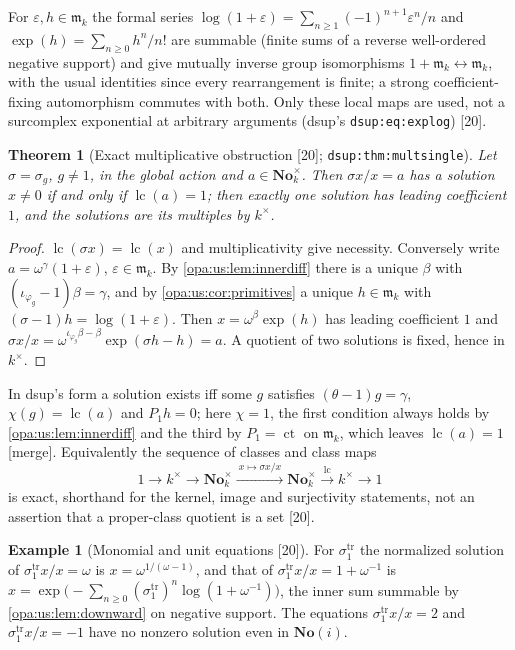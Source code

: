 \documentclass[11pt,oneside]{article}
\numberwithin{equation}{section}
\newtheorem{theorem}{Theorem}[section]
\theoremstyle{definition}
\newtheorem{example}[example]{Example}
\theoremstyle{remark}
\newcommand{\No}{\mathbf{No}}
\newcommand{\SC}{\mathbf{No}(i)}
\newcommand{\mm}{\mathfrak m}
\newcommand{\lc}{\operatorname{lc}}
\newcommand{\ct}{\operatorname{ct}}
\newcommand{\src}[1]{\textup{\textsf{\small[#1]}}}
\newcommand{\mergetag}{\textup{\textsf{\small[merge]}}}
\newcommand{\lbl}[1]{\nolinkurl{#1}}
\begin{document}
For $\varepsilon,h\in\mm_k$ the formal series $\log(1+\varepsilon)=\sum_{n\ge1}(-1)^{n+1}\varepsilon^n/n$ and $\exp(h)=\sum_{n\ge0}h^n/n!$ are summable (finite
sums of a reverse well-ordered negative support) and give mutually inverse group isomorphisms $1+\mm_k\leftrightarrow\mm_k$, with the usual
identities since every rearrangement is finite; a strong coefficient-fixing automorphism commutes with both. Only these local maps are used, not a
surcomplex exponential at arbitrary arguments (dsup's \lbl{dsup:eq:explog}) \src{20}.

\begin{theorem}[Exact multiplicative obstruction \src{20}; \lbl{dsup:thm:multsingle}]\label{opa:us:thm:multiplicative}
Let $\sigma=\sigma_g$, $g\ne1$, in the global action and $a\in\No_k^\times$. Then $\sigma x/x=a$ has a solution $x\ne0$ if and only if $\lc(a)=1$; then
exactly one solution has leading coefficient $1$, and the solutions are its multiples by $k^\times$.
\end{theorem}
\begin{proof}
$\lc(\sigma x)=\lc(x)$ and multiplicativity give necessity. Conversely write $a=\omega^\gamma(1+\varepsilon)$, $\varepsilon\in\mm_k$. By
\cref{opa:us:lem:innerdiff} there is a unique $\beta$ with $(\iota_{\varphi_g}-1)\beta=\gamma$, and by \cref{opa:us:cor:primitives} a unique $h\in\mm_k$ with
$(\sigma-1)h=\log(1+\varepsilon)$. Then $x=\omega^\beta\exp(h)$ has leading coefficient $1$ and $\sigma x/x=\omega^{\iota_{\varphi_g}\beta-\beta}\exp(\sigma h-h)=a$.
A quotient of two solutions is fixed, hence in $k^\times$.
\end{proof}

In dsup's form a solution exists iff some $g$ satisfies $(\theta-1)g=\gamma$, $\chi(g)=\lc(a)$ and $P_1h=0$; here $\chi=1$, the first condition always
holds by \cref{opa:us:lem:innerdiff} and the third by $P_1=\ct$ on $\mm_k$, which leaves $\lc(a)=1$ \mergetag. Equivalently the sequence of classes and
class maps
\begin{equation}\label{opa:us:eq:multexact}
 1\longrightarrow k^\times\longrightarrow\No_k^\times\xrightarrow{\ x\mapsto\sigma x/x\ }\No_k^\times\xrightarrow{\ \lc\ }k^\times\longrightarrow1
\end{equation}
is exact, shorthand for the kernel, image and surjectivity statements, not an assertion that a proper-class quotient is a set \src{20}.

\begin{example}[Monomial and unit equations \src{20}]\label{opa:us:ex:multiplicative}
For $\sigma^{\mathrm{tr}}_1$ the normalized solution of $\sigma^{\mathrm{tr}}_1x/x=\omega$ is $x=\omega^{1/(\omega-1)}$, and that of $\sigma^{\mathrm{tr}}_1x/x=1+\omega^{-1}$ is
$x=\exp\bigl(-\sum_{n\ge0}(\sigma^{\mathrm{tr}}_1)^n\log(1+\omega^{-1})\bigr)$, the inner sum summable by \cref{opa:us:lem:downward} on negative support. The
equations $\sigma^{\mathrm{tr}}_1x/x=2$ and $\sigma^{\mathrm{tr}}_1x/x=-1$ have no nonzero solution even in $\SC$.
\end{example}
\end{document}

